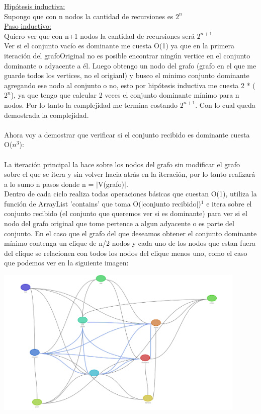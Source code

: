 \underline{Hipótesis inductiva:}\\

Supongo que con n nodos la cantidad de recursiones es $2^n$ \\

\underline{Paso inductivo:}\\

Quiero ver que con n+1 nodos la cantidad de recursiones será $2^{n+1}$\\

Ver si el conjunto vacío es dominante me cuesta O(1) ya que en la primera iteración del grafoOriginal no es posible encontrar ningún vertice en el conjunto dominante o adyacente a él. Luego obtengo un nodo del grafo (grafo en el que me guarde todos los vertices, no el origianl) y busco el minimo conjunto dominante agregando ese nodo al conjunto o no, esto por hipótesis inductiva me cuesta 2 * ($2^n$), ya que tengo que calcular 2 veces el conjunto dominante mínimo para n nodos. Por lo tanto la complejidad me termina costando  $2^{n+1}$. Con lo cual queda demostrada la complejidad.\\
\\
Ahora voy a demostrar que verificar si el conjunto recibido es dominante cuesta  O($n^3$):\\
\\
La iteración principal la hace sobre los nodos del grafo sin modificar el grafo sobre el que se itera y sin volver hacia atrás en la iteración, por lo tanto realizará a lo sumo n pasos donde n = $|$V(grafo)$|$.\\
Dentro de cada ciclo realiza todas operaciones básicas que cuestan O(1), utiliza la función de ArrayList 'contains' que toma O($|$conjunto recibido$|$)$^{1}$  e itera sobre el conjunto recibido (el conjunto que queremos ver si es dominante) para ver si el nodo del grafo original que tome pertence a algun adyacente o es parte del conjunto. En el caso que el grafo del que deseamos obtener el conjunto dominante mínimo contenga un clique de n/2 nodos y cada uno de los nodos que estan fuera del clique se relacionen con todos los nodos del clique menos uno, como el caso que podemos ver en la siguiente imagen:\\

 \begin {center}
\includegraphics[width=12cm]{./graficos/grafo-clique-N-sobre-2.png}
\end {center} 

